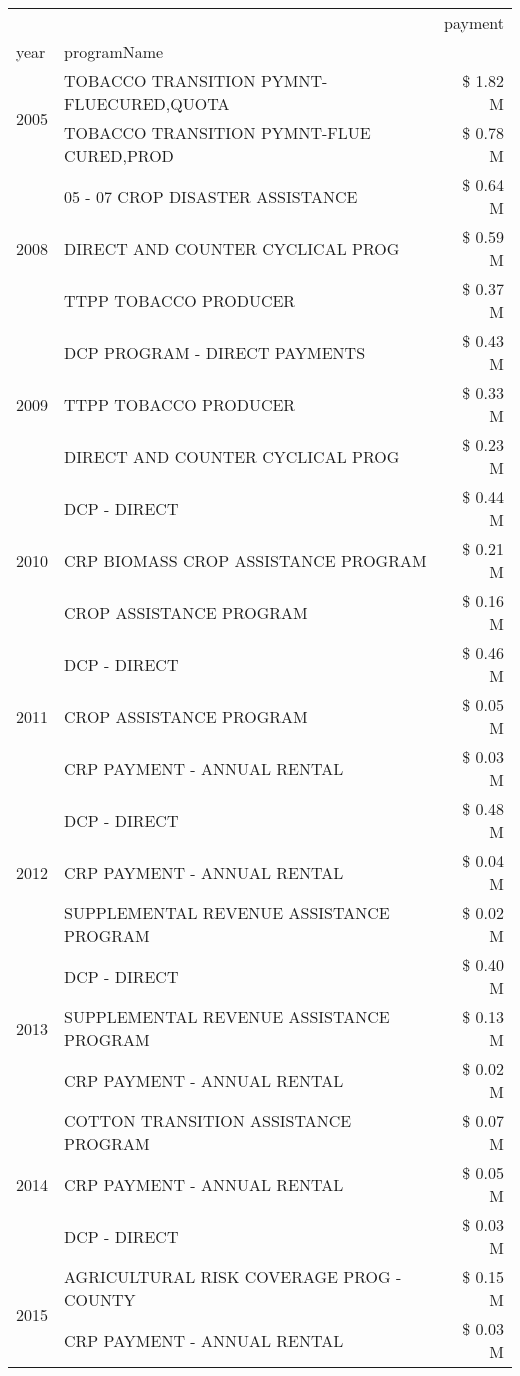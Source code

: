 \begin{tabular}{llr}
\toprule
 &  & payment \\
year & programName &  \\
\midrule
\multirow[t]{2}{*}{2005} & TOBACCO TRANSITION PYMNT-FLUECURED,QUOTA & \$ 1.82 M \\
 & TOBACCO TRANSITION PYMNT-FLUE CURED,PROD & \$ 0.78 M \\
\cline{1-3}
\multirow[t]{3}{*}{2008} & 05 - 07 CROP DISASTER ASSISTANCE & \$ 0.64 M \\
 & DIRECT AND COUNTER CYCLICAL PROG & \$ 0.59 M \\
 & TTPP TOBACCO PRODUCER & \$ 0.37 M \\
\cline{1-3}
\multirow[t]{3}{*}{2009} & DCP PROGRAM - DIRECT PAYMENTS & \$ 0.43 M \\
 & TTPP TOBACCO PRODUCER & \$ 0.33 M \\
 & DIRECT AND COUNTER CYCLICAL PROG & \$ 0.23 M \\
\cline{1-3}
\multirow[t]{3}{*}{2010} & DCP - DIRECT & \$ 0.44 M \\
 & CRP BIOMASS CROP ASSISTANCE PROGRAM & \$ 0.21 M \\
 & CROP ASSISTANCE PROGRAM & \$ 0.16 M \\
\cline{1-3}
\multirow[t]{3}{*}{2011} & DCP - DIRECT & \$ 0.46 M \\
 & CROP ASSISTANCE PROGRAM & \$ 0.05 M \\
 & CRP PAYMENT - ANNUAL RENTAL & \$ 0.03 M \\
\cline{1-3}
\multirow[t]{3}{*}{2012} & DCP - DIRECT & \$ 0.48 M \\
 & CRP PAYMENT - ANNUAL RENTAL & \$ 0.04 M \\
 & SUPPLEMENTAL REVENUE ASSISTANCE PROGRAM & \$ 0.02 M \\
\cline{1-3}
\multirow[t]{3}{*}{2013} & DCP - DIRECT & \$ 0.40 M \\
 & SUPPLEMENTAL REVENUE ASSISTANCE PROGRAM & \$ 0.13 M \\
 & CRP PAYMENT - ANNUAL RENTAL & \$ 0.02 M \\
\cline{1-3}
\multirow[t]{3}{*}{2014} & COTTON TRANSITION ASSISTANCE PROGRAM & \$ 0.07 M \\
 & CRP PAYMENT - ANNUAL RENTAL & \$ 0.05 M \\
 & DCP - DIRECT & \$ 0.03 M \\
\cline{1-3}
\multirow[t]{3}{*}{2015} & AGRICULTURAL RISK COVERAGE PROG - COUNTY & \$ 0.15 M \\
 & CRP PAYMENT - ANNUAL RENTAL & \$ 0.03 M \\

\end{tabular}
